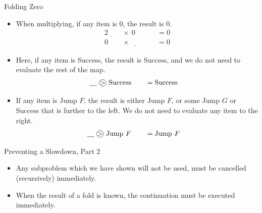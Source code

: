 \documentclass{beamer}
\newcommand*\circled[1]{\tikz[baseline=(char.base)]{
            \node[shape=circle,draw,inner sep=0pt] (char) {#1};}}
\begin{document}
\begin{frame}{Folding Zero}
    \begin{itemize}
        \item When multiplying, if any item is 0, the result is 0.
            \begin{alignat*}{2}
                \underline{\hspace{1em}} &~\times~ 0 \hspace{1em} &&= 0 \\
                0 &~\times~ \underline{\hspace{1em}} \hspace{1em} &&= 0
            \end{alignat*}
        \item Here, if any item is Success, the result is Success, and we do not need to evaluate
            the rest of the map.
            \begin{alignat*}{2}
                \underline{\hspace{1em}} &~\circled{$>$}~ \textnormal{Success} \hspace{1em} &&= \textnormal{Success}
            \end{alignat*}
        \item If any item is Jump $F$, the result is either Jump $F$, or some Jump $G$ or Success
            that is further to the left. We do not need to evaluate any item to the right.
            \begin{alignat*}{2}
                \underline{\hspace{1em}} &~\circled{$>$}~ \textnormal{Jump}~F \hspace{1em} &&= \textnormal{Jump}~F
            \end{alignat*}
    \end{itemize}
\end{frame}

\begin{frame}{Preventing a Slowdown, Part 2}
    \begin{itemize}
        \item Any subproblem which we have shown will not be used, must be cancelled (recursively)
            immediately.
        \item When the result of a fold is known, the continuation must be executed immediately.
    \end{itemize}
\end{frame}
\end{document}
